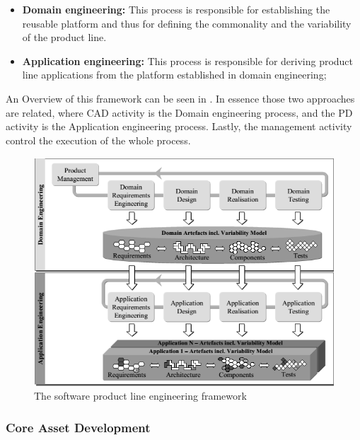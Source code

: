 \begin{itemize}
\item \textbf{Domain engineering:} This process is responsible for establishing the reusable platform and thus for defining the commonality and the variability of the product line.
\item \textbf{Application engineering:} This process is responsible for deriving product line applications from the platform established in domain engineering;
\end{itemize}
An Overview of this framework can be seen in .  In essence those two approaches are related, where  \acf{CAD} activity is the Domain engineering process, and the \acf{PD} activity is the Application engineering process. Lastly, the management activity control the execution of the whole process. 





\begin{figure}[htp]
\begin{center}
  \includegraphics[width=13cm]{chapters/background/img/pohl-framework.png}
  \caption[The software product line engineering framework]{The software product line engineering framework \citep{Pohl2005}}
  \label{fg:spl-pohlframework}
\end{center}
\end{figure}





\subsubsection{Core Asset Development}


